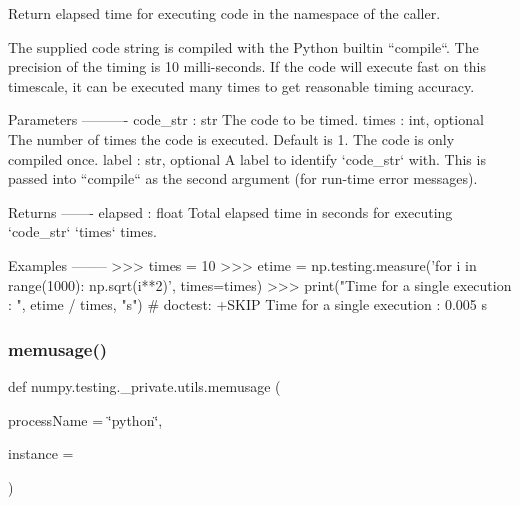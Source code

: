 \begin{DoxyVerb}Return elapsed time for executing code in the namespace of the caller.

The supplied code string is compiled with the Python builtin ``compile``.
The precision of the timing is 10 milli-seconds. If the code will execute
fast on this timescale, it can be executed many times to get reasonable
timing accuracy.

Parameters
----------
code_str : str
    The code to be timed.
times : int, optional
    The number of times the code is executed. Default is 1. The code is
    only compiled once.
label : str, optional
    A label to identify `code_str` with. This is passed into ``compile``
    as the second argument (for run-time error messages).

Returns
-------
elapsed : float
    Total elapsed time in seconds for executing `code_str` `times` times.

Examples
--------
>>> times = 10
>>> etime = np.testing.measure('for i in range(1000): np.sqrt(i**2)', times=times)
>>> print("Time for a single execution : ", etime / times, "s")  # doctest: +SKIP
Time for a single execution :  0.005 s\end{DoxyVerb}
 \mbox{\label{namespacenumpy_1_1testing_1_1__private_1_1utils_a80333a719dea3a9d4215814dffaf10dc}} 
\subsubsection{\texorpdfstring{memusage()}{memusage()}\hspace{0.1cm}{\footnotesize\ttfamily [1/3]}}
{\footnotesize\ttfamily def numpy.\+testing.\+\_\+private.\+utils.\+memusage (\begin{DoxyParamCaption}\item[{}]{process\+Name = {\ttfamily \char`\"{}python\char`\"{}},  }\item[{}]{instance = {} }\end{DoxyParamCaption})}

\mbox{\label{namespacenumpy_1_1testing_1_1__private_1_1utils_a13bb93e204bc1afe5522de6eed6d07cc}} 
